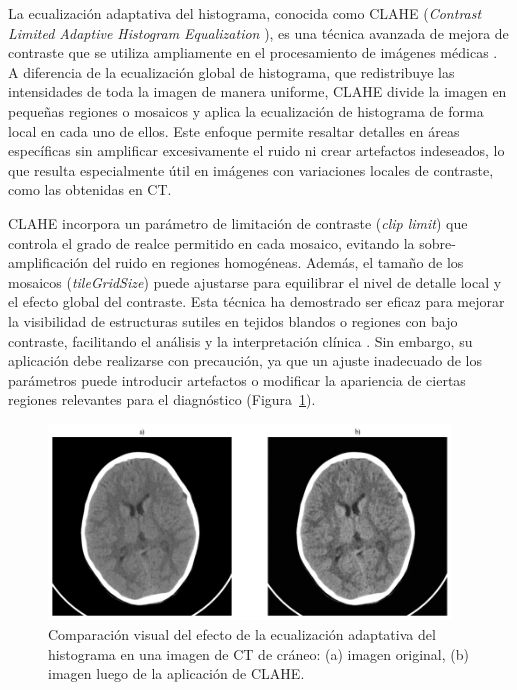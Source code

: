 La ecualización adaptativa del histograma, conocida como CLAHE (\textit{Contrast Limited Adaptive Histogram Equalization} \cite{CLAHE}), es una técnica avanzada de mejora de contraste que se utiliza ampliamente en el procesamiento de imágenes médicas \cite{CLAHE}. A diferencia de la ecualización global de histograma, que redistribuye las intensidades de toda la imagen de manera uniforme, CLAHE divide la imagen en pequeñas regiones o mosaicos y aplica la ecualización de histograma de forma local en cada uno de ellos. Este enfoque permite resaltar detalles en áreas específicas sin amplificar excesivamente el ruido ni crear artefactos indeseados, lo que resulta especialmente útil en imágenes con variaciones locales de contraste, como las obtenidas en CT.

CLAHE incorpora un parámetro de limitación de contraste (\emph{clip limit}) que controla el grado de realce permitido en cada mosaico, evitando la sobre-amplificación del ruido en regiones homogéneas. Además, el tamaño de los mosaicos (\emph{tileGridSize}) puede ajustarse para equilibrar el nivel de detalle local y el efecto global del contraste. Esta técnica ha demostrado ser eficaz para mejorar la visibilidad de estructuras sutiles en tejidos blandos o regiones con bajo contraste, facilitando el análisis y la interpretación clínica \cite{rangayyan2005biomedical}. Sin embargo, su aplicación debe realizarse con precaución, ya que un ajuste inadecuado de los parámetros puede introducir artefactos o modificar la apariencia de ciertas regiones relevantes para el diagnóstico (Figura~\ref{fig:filter-clahe}).

\begin{figure}[H]
    \centering
    \includegraphics[width=0.95\textwidth]{Graphics/cahe.png}
    \caption{Comparación visual del efecto de la ecualización adaptativa del histograma en una imagen de CT de cráneo: (a) imagen original, (b) imagen luego de la aplicación de CLAHE.}
    \label{fig:filter-clahe}
\end{figure}

